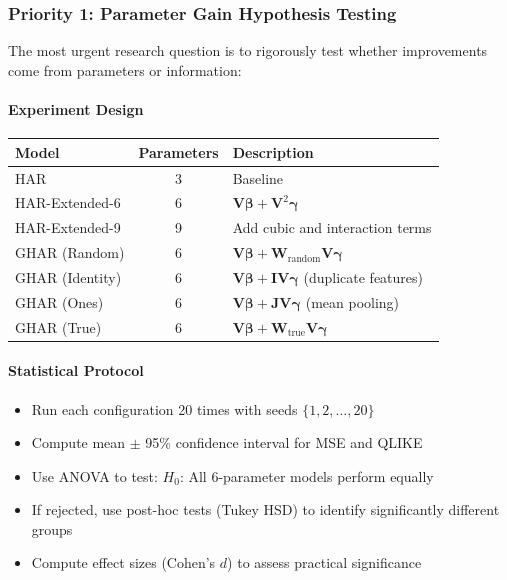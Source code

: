 \documentclass[10pt,a4paper]{article}
\begin{document}
\subsubsection{Priority 1: Parameter Gain Hypothesis Testing}

The most urgent research question is to rigorously test whether improvements come from parameters or information:

\paragraph{Experiment Design}

\begin{table}[H]
\centering
\small
\begin{tabular}{lcl}
\toprule
Model & Parameters & Description \\
\midrule
HAR & 3 & Baseline \\
HAR-Extended-6 & 6 & $\mathbf{V} \boldsymbol{\beta} + \mathbf{V}^2 \boldsymbol{\gamma}$ \\
HAR-Extended-9 & 9 & Add cubic and interaction terms \\
GHAR (Random) & 6 & $\mathbf{V} \boldsymbol{\beta} + \mathbf{W}_{\text{random}} \mathbf{V} \boldsymbol{\gamma}$ \\
GHAR (Identity) & 6 & $\mathbf{V} \boldsymbol{\beta} + \mathbf{I} \mathbf{V} \boldsymbol{\gamma}$ (duplicate features) \\
GHAR (Ones) & 6 & $\mathbf{V} \boldsymbol{\beta} + \mathbf{J} \mathbf{V} \boldsymbol{\gamma}$ (mean pooling) \\
GHAR (True) & 6 & $\mathbf{V} \boldsymbol{\beta} + \mathbf{W}_{\text{true}} \mathbf{V} \boldsymbol{\gamma}$ \\
\bottomrule
\end{tabular}
\end{table}

\paragraph{Statistical Protocol}

\begin{itemize}
\item Run each configuration 20 times with seeds $\{1, 2, \ldots, 20\}$
\item Compute mean $\pm$ 95\% confidence interval for MSE and QLIKE
\item Use ANOVA to test: $H_0$: All 6-parameter models perform equally
\item If rejected, use post-hoc tests (Tukey HSD) to identify significantly different groups
\item Compute effect sizes (Cohen's $d$) to assess practical significance
\end{itemize}
\end{document}
